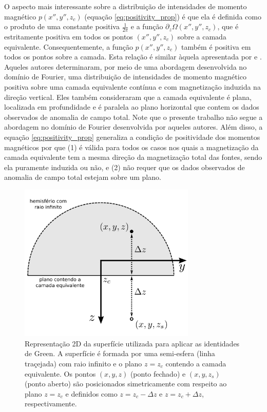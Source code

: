 O aspecto mais interessante sobre a distribuição de intensidades de momento magnético 
$p(x'', y'', z_{c})$ (equação \ref{eq:positivity_prop}) é que ela é definida como o produto de 
uma constante positiva $\frac{1}{2\pi}$ e a função $\partial_{z} \Omega(x'',y'',z_{c})$, que é 
estritamente positiva em todos os pontos $(x'',y'',z_{c})$ sobre a camada equivalente. 
Consequentemente, a função $p(x'', y'', z_{c})$ também é positiva em todos os pontos sobre a camada. 
Esta relação é similar àquela apresentada por \cite{pedersen1991} e \cite{li_etal_2014}. 
Aqueles autores determinaram, por meio de uma abordagem desenvolvida no domínio de Fourier, 
uma distribuição de intensidades de momento magnético positiva sobre uma camada equivalente 
contínua e com magnetização induzida na direção vertical. Eles também 
consideraram que a camada equivalente é plana, localizada em profundidade e é paralela 
ao plano horizontal que contem os dados observados de anomalia de campo total. 
Note que o presente trabalho não segue a abordagem no domínio de Fourier desenvolvida por aqueles 
autores. Além disso, a equação \ref{eq:positivity_prop} generaliza a condição de positividade dos 
momentos magnéticos por que (1) é válida para todos os casos nos quais a magnetização da camada 
equivalente tem a mesma direção da magnetização total das fontes, sendo ela puramente induzida ou não, 
e (2) não requer que os dados observados de anomalia de campo total estejam sobre um plano.

\begin{figure}[H]
	\centering
	\includegraphics[width=0.75\textwidth]{Fig/eqlayer/surface_Green.png}
	\caption{ Representação 2D da superfície utilizada para aplicar as identidades de Green. A superfície é formada por uma semi-esfera (linha traçejada) com raio infinito e o plano $z = z_{c}$ contendo a camada equivalente. Os pontos $(x, y, z)$ (ponto fechado) e $(x, y, z_{s})$ (ponto aberto) são posicionados simetricamente com respeito ao plano $z = z_{c}$ e definidos como $z = z_{c} - \Delta z$ e $z = z_{c} + \Delta z$, respectivamente.}
	\label{fig:surface_Green}
\end{figure}